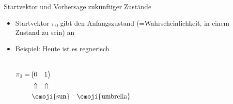 \begin{frame}{Startvektor und Vorhersage zukünftiger Zustände}
    \begin{itemize}
        \item<1-> Startvektor $\pi_0$ gibt den Anfangszustand (=Wahrscheinlichkeit, in einem Zustand zu sein) an
        \item<2-> Beispiel: Heute ist es regnerisch
              \begin{columns}
                  \[
                      \begin{aligned}
                          \pi_0 =
                           & \begin{pmatrix}
                                 0 & 1
                             \end{pmatrix}                                                     \\
                           & \begin{matrix}
                                 \;\; \Uparrow & \Uparrow
                             \end{matrix}                                           \\
                           & \begin{matrix}
                                 \; \text{\emoji{sun}} & \text{\emoji{umbrella}}
                             \end{matrix}
                      \end{aligned}
                  \]
\end{columns}
\end{itemize}
\end{frame}
